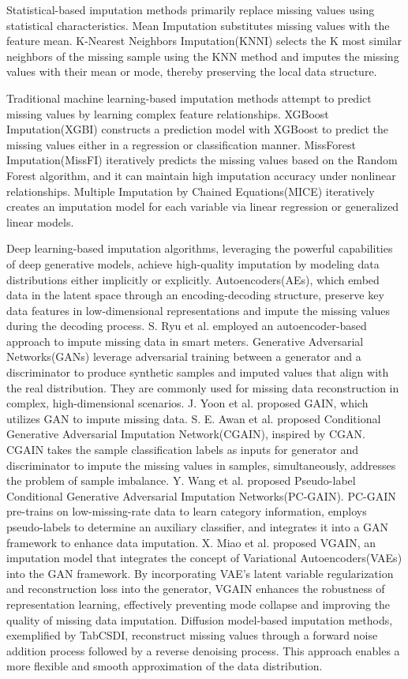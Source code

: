 \documentclass[final,1p,times]{elsarticle}
\begin{document}
Statistical-based imputation methods primarily replace missing values using statistical characteristics. Mean Imputation\cite{18} substitutes missing values with the feature mean. K-Nearest Neighbors Imputation(KNNI)\cite{19} selects the K most similar neighbors of the missing sample using the KNN method and imputes the missing values with their mean or mode, thereby preserving the local data structure.

Traditional machine learning-based imputation methods attempt to predict missing values by learning complex feature relationships. XGBoost Imputation(XGBI)\cite{20} constructs a prediction model with XGBoost to predict the missing values either in a regression or classification manner. MissForest Imputation(MissFI)\cite{21} iteratively predicts the missing values based on the Random Forest algorithm, and it can maintain high imputation accuracy under nonlinear relationships. Multiple Imputation by Chained Equations(MICE)\cite{22} iteratively creates an imputation model for each variable via linear regression or generalized linear models.  

Deep learning-based imputation algorithms, leveraging the powerful capabilities of deep generative models, achieve high-quality imputation by modeling data distributions either implicitly or explicitly. Autoencoders(AEs), which embed data in the latent space through an encoding-decoding structure, preserve key data features in low-dimensional representations and impute the missing values during the decoding process. S. Ryu et al.\cite{23} employed an autoencoder-based approach to impute missing data in smart meters. Generative Adversarial Networks(GANs) leverage adversarial training between a generator and a discriminator to produce synthetic samples and imputed values that align with the real distribution. They are commonly used for missing data reconstruction in complex, high-dimensional scenarios. J. Yoon et al.\cite{24} proposed GAIN, which utilizes GAN to impute missing data. S. E. Awan et al.\cite{25} proposed Conditional Generative Adversarial Imputation Network(CGAIN), inspired by CGAN. CGAIN takes the sample classification labels as inputs for generator and discriminator to impute the missing values in samples, simultaneously, addresses the problem of sample imbalance. Y. Wang et al.\cite{26} proposed Pseudo-label Conditional Generative Adversarial Imputation Networks(PC-GAIN). PC-GAIN pre-trains on low-missing-rate data to learn category information, employs pseudo-labels to determine an auxiliary classifier, and integrates it into a GAN framework to enhance data imputation. X. Miao et al.\cite{27} proposed VGAIN, an imputation model that integrates the concept of Variational Autoencoders(VAEs) into the GAN framework. By incorporating VAE's latent variable regularization and reconstruction loss into the generator, VGAIN enhances the robustness of representation learning, effectively preventing mode collapse and improving the quality of missing data imputation. Diffusion model-based imputation methods, exemplified by TabCSDI\cite{28}, reconstruct missing values through a forward noise addition process followed by a reverse denoising process. This approach enables a more flexible and smooth approximation of the data distribution.
\end{document}
